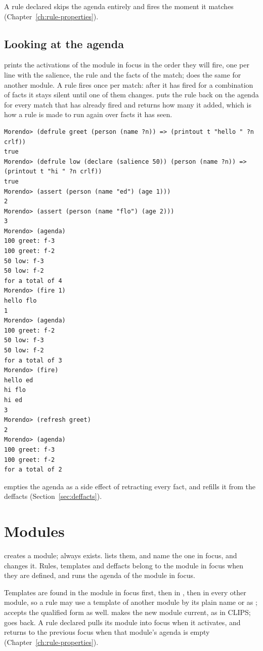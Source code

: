 A rule declared  skips the agenda entirely and fires the
moment it matches (Chapter~\ref{ch:rule-properties}).

\subsection{Looking at the agenda}
\label{sec:agenda-listing}

 prints the activations of the module in focus in the order
they will fire, one per line with the salience, the rule and the facts of
the match;  does the same for another module. A rule
fires once per match: after it has fired for a combination of facts it
stays silent until one of them changes.  puts the
rule back on the agenda for every match that has already fired and
returns how many it added, which is how a rule is made to run again over
facts it has seen.

\begin{lstlisting}[style=shell]
Morendo> (defrule greet (person (name ?n)) => (printout t "hello " ?n crlf))
true
Morendo> (defrule low (declare (salience 50)) (person (name ?n)) => (printout t "hi " ?n crlf))
true
Morendo> (assert (person (name "ed") (age 1)))
2
Morendo> (assert (person (name "flo") (age 2)))
3
Morendo> (agenda)
100 greet: f-3
100 greet: f-2
50 low: f-3
50 low: f-2
for a total of 4
Morendo> (fire 1)
hello flo
1
Morendo> (agenda)
100 greet: f-2
50 low: f-3
50 low: f-2
for a total of 3
Morendo> (fire)
hello ed
hi flo
hi ed
3
Morendo> (refresh greet)
2
Morendo> (agenda)
100 greet: f-3
100 greet: f-2
for a total of 2
\end{lstlisting}

 empties the agenda as a side effect of retracting every
fact, and refills it from the deffacts (Section~\ref{sec:deffacts}).

\section{Modules}
\label{sec:modules}

 creates a module;  always exists.
 lists them,  and 
name the one in focus, and  changes it. Rules,
templates and deffacts belong to the module in focus when they are
defined, and  runs the agenda of the module in focus.

Templates are found in the module in focus first, then in ,
then in every other module, so a rule may use a template of another
module by its plain name or as ;  accepts the
qualified form as well.  makes the new module current, as
in CLIPS;  goes back. A rule declared
 pulls its module into focus when it activates, and
 returns to the previous focus when that module's agenda is
empty (Chapter~\ref{ch:rule-properties}).
